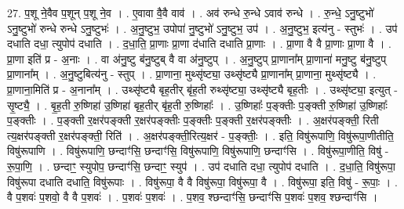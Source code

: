\documentclass[17pt]{extarticle}
\begin{document}
27. प॒शू ने॒वैव प॒शून् प॒शू ने॒व । . ए॒वावा वै॒वै वाव॑ । . अव॑ रुन्धे रु॒न्धे ऽवाव॑ रुन्धे । . रु॒न्धे॒ ऽनु॒ष्टुभो॑ ऽनु॒ष्टुभो॑ रुन्धे रुन्धे ऽनु॒ष्टुभः॑ । . अ॒नु॒ष्टुभ॒ उपोपा॑ नु॒ष्टुभो॑ ऽनु॒ष्टुभ॒ उप॑ । . अ॒नु॒ष्टुभ॒ इत्य॑नु - स्तुभः॑ । . उप॑ दधाति दधा॒ त्युपोप॑ दधाति । . द॒धा॒ति॒ प्रा॒णाः प्रा॒णा द॑धाति दधाति प्रा॒णाः । . प्रा॒णा वै वै प्रा॒णाः प्रा॒णा वै । . प्रा॒णा इति॑ प्र - अ॒नाः । . वा अ॑नु॒ष्टु ब॑नु॒ष्टुब् वै वा अ॑नु॒ष्टुप् । . अ॒नु॒ष्टुप् प्रा॒णाना᳚म् प्रा॒णाना॑ मनु॒ष्टु ब॑नु॒ष्टुप् प्रा॒णाना᳚म् । . अ॒नु॒ष्टुबित्य॑नु - स्तुप् । . प्रा॒णाना॒ मुथ्सृ॑ष्ट्या॒ उथ्सृ॑ष्ट्यै प्रा॒णाना᳚म् प्रा॒णाना॒ मुथ्सृ॑ष्ट्यै । . प्रा॒णाना॒मिति॑ प्र - अ॒नाना᳚म् । . उथ्सृ॑ष्ट्यै बृह॒तीर् बृ॑ह॒ती रुथ्सृ॑ष्ट्या॒ उथ्सृ॑ष्ट्यै बृह॒तीः । . उथ्सृ॑ष्ट्या॒ इत्युत् - सृ॒ष्ट्यै॒ । . बृ॒ह॒ती रु॒ष्णिहा॑ उ॒ष्णिहा॑ बृह॒तीर् बृ॑ह॒ती रु॒ष्णिहाः᳚ । . उ॒ष्णिहाः᳚ प॒ङ्क्तीः प॒ङ्क्ती रु॒ष्णिहा॑ उ॒ष्णिहाः᳚ प॒ङ्क्तीः । . प॒ङ्क्ती र॒क्षर॑पङ्क्ती र॒क्षर॑पङ्क्तीः प॒ङ्क्तीः प॒ङ्क्ती र॒क्षर॑पङ्क्तीः । . अ॒क्षर॑पङ्क्ती॒ रिती त्य॒क्षर॑पङ्क्ती र॒क्षर॑पङ्क्ती॒ रिति॑ । . अ॒क्षर॑पङ्क्ती॒रित्य॒क्षर॑ - प॒ङ्क्तीः॒ । . इति॒ विषु॑रूपाणि॒ विषु॑रूपा॒णीतीति॒ विषु॑रूपाणि । . विषु॑रूपाणि॒ छन्दाꣳ॑सि॒ छन्दाꣳ॑सि॒ विषु॑रूपाणि॒ विषु॑रूपाणि॒ छन्दाꣳ॑सि । . विषु॑रूपा॒णीति॒ विषु॑ - रू॒पा॒णि॒ । . छन्दाꣳ॒॒ स्युपोप॒ छन्दाꣳ॑सि॒ छन्दाꣳ॒॒ स्युप॑ । . उप॑ दधाति दधा॒ त्युपोप॑ दधाति । . द॒धा॒ति॒ विषु॑रूपा॒ विषु॑रूपा दधाति दधाति॒ विषु॑रूपाः । . विषु॑रूपा॒ वै वै विषु॑रूपा॒ विषु॑रूपा॒ वै । . विषु॑रूपा॒ इति॒ विषु॑ - रू॒पाः॒ । . वै प॒शवः॑ प॒शवो॒ वै वै प॒शवः॑ । . प॒शवः॑ प॒शवः॑ । . प॒शव॒ श्छन्दाꣳ॑सि॒ छन्दाꣳ॑सि प॒शवः॑ प॒शव॒ श्छन्दाꣳ॑सि । \newline
\end{document}
